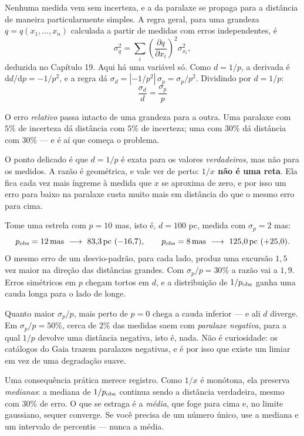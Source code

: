 \documentclass[11pt,a4paper]{article}
\begin{document}
Nenhuma medida vem sem incerteza, e a da paralaxe se propaga para a distância de maneira particularmente simples. A regra geral, para uma grandeza $q=q(x_1,\ldots,x_n)$ calculada a partir de medidas com erros independentes, é
\[
\sigma_q^{2}=\sum_i\left(\frac{\partial q}{\partial x_i}\right)^{2}\sigma_{x_i}^{2},
\]
deduzida no Capítulo 19. Aqui há uma variável só. Como $d=1/p$, a derivada é $\mathrm{d}d/\mathrm{d}p=-1/p^{2}$, e a regra dá $\sigma_d=|{-}1/p^{2}|\,\sigma_p=\sigma_p/p^{2}$. Dividindo por $d=1/p$:
\[
\boxed{\ \frac{\sigma_d}{d}=\frac{\sigma_p}{p}\ }
\]

O erro \emph{relativo} passa intacto de uma grandeza para a outra. Uma paralaxe com $5\%$ de incerteza dá distância com $5\%$ de incerteza; uma com $30\%$ dá distância com $30\%$ --- e é aí que começa o problema.

O ponto delicado é que $d=1/p$ é exata para os valores \emph{verdadeiros}, mas não para os medidos. A razão é geométrica, e vale ver de perto: \textbf{$1/x$ não é uma reta}. Ela fica cada vez mais íngreme à medida que $x$ se aproxima de zero, e por isso um erro para baixo na paralaxe custa muito mais em distância do que o mesmo erro para cima.

Tome uma estrela com $p=10$ mas, isto é, $d=100$ pc, medida com $\sigma_p=2$ mas:
\[
p_{\rm obs}=12\,\mathrm{mas}\ \longrightarrow\ 83{,}3\,\mathrm{pc}\ (-16{,}7),
\qquad
p_{\rm obs}=8\,\mathrm{mas}\ \longrightarrow\ 125{,}0\,\mathrm{pc}\ (+25{,}0).
\]
O mesmo erro de um desvio-padrão, para cada lado, produz uma excursão $1{,}5$ vez maior na direção das distâncias grandes. Com $\sigma_p/p=30\%$ a razão vai a $1{,}9$. Erros simétricos em $p$ chegam tortos em $d$, e a distribuição de $1/p_{\rm obs}$ ganha uma cauda longa para o lado de longe.

Quanto maior $\sigma_p/p$, mais perto de $p=0$ chega a cauda inferior --- e ali $d$ diverge. Em $\sigma_p/p=50\%$, cerca de $2\%$ das medidas saem com \emph{paralaxe negativa}, para a qual $1/p$ devolve uma distância negativa, isto é, nada. Não é curiosidade: os catálogos do Gaia trazem paralaxes negativas, e é por isso que existe um limiar em vez de uma degradação suave.

Uma consequência prática merece registro. Como $1/x$ é monótona, ela preserva \emph{medianas}: a mediana de $1/p_{\rm obs}$ continua sendo a distância verdadeira, mesmo com $30\%$ de erro. O que se estraga é a \emph{média}, que foge para cima e, no limite gaussiano, sequer converge. Se você precisa de um número único, use a mediana e um intervalo de percentis --- nunca a média.
\end{document}
